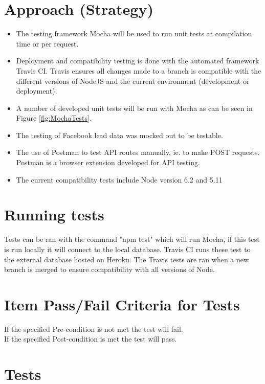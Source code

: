 \documentclass{article}
\begin{document}
\section{Approach (Strategy)}
\begin{itemize}
	\item The testing framework Mocha will be used to run unit tests at compilation time or per request.
	\item Deployment and compatibility testing is done with the automated framework Travis CI. Travis ensures all changes made to a branch is compatible with the different versions of NodeJS and the current environment (development or deployment).
	\item A number of developed unit tests will be run with Mocha as can be seen in Figure \ref{fig:MochaTests}.
	\item The testing of Facebook lead data was mocked out to be testable. 
	\item The use of Postman to test API routes manually, ie. to make POST requests. Postman is a browser extension developed for API testing.
	\item The current compatibility tests include Node version 6.2 and 5.11 
\end{itemize}


\section{Running tests}
Tests can be ran with the command "npm test" which will run Mocha, if this test is run locally it will connect to the local database.
Travis CI runs these test to the external database hosted on Heroku. The Travis tests are ran when a new branch is merged to ensure compatibility with all versions of Node.
\section{Item Pass/Fail Criteria for Tests}
If the specified Pre-condition is not met the test will fail. \\
If the specified Post-condition is met the test will pass.
\cleardoublepage
\section{Tests}
\end{document}
